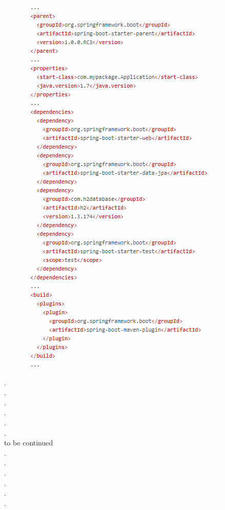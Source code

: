\documentclass[12pt, letterpaper]{article}
\begin{document}
	\begin{figure}[H]
		\centering
		\includegraphics{POM_example.png}
	\end{figure}

.\\
.\\
.\\
.\\
.\\
.\\
to be continued\\
.\\
.\\
.\\
.\\
.\\
.\\


\end{document}
